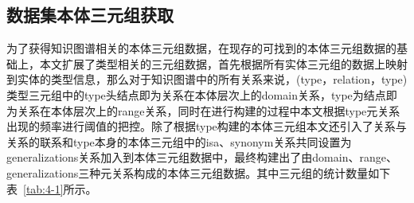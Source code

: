 \subsection{数据集本体三元组获取}
为了获得知识图谱相关的本体三元组数据，在现存的可找到的本体三元组数据的基础上，本文扩展了类型相关的三元组数据，首先根据所有实体三元组的数据上映射到实体的类型信息，那么对于知识图谱中的所有关系来说，(type，relation，type)类型三元组中的type头结点即为关系在本体层次上的domain关系，type为结点即为关系在本体层次上的range关系，同时在进行构建的过程中本文根据type元关系出现的频率进行阈值的把控。除了根据type构建的本体三元组本文还引入了关系与关系的联系和type本身的本体三元组中的isa、synonym关系共同设置为generalizations关系加入到本体三元组数据中，最终构建出了由domain、range、generalizations三种元关系构成的本体三元组数据。其中三元组的统计数量如下表~\ref{tab:4-1}所示。
\begin{table}[h]
  \caption{数据集统计数据(括号中为未见组件数量)}
  \label{tab:4-1}
  \end{table}

